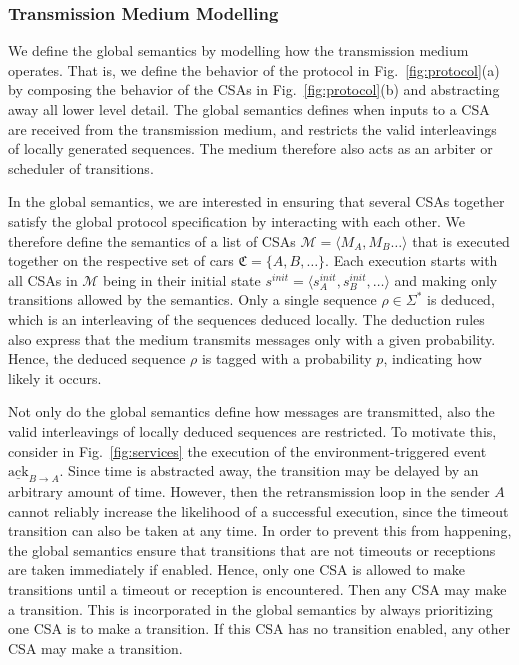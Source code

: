 \documentclass{sig-alternate}
\newcommand{\M}{\mathcal{M}}
\newcommand{\SAP}{\mathfrak{C}}
\newcommand{\locev}[1]{\underline{#1}}
\newcommand{\ack}{\mathrm{ack}}
\newcommand{\eenv}[3]{\locev{#1}_{{#2} \rightarrow {#3}}}
\newcommand{\fig}[1]{Fig.\ \ref{fig:#1}}
\begin{document}
\subsubsection{Transmission Medium Modelling}


We define the global semantics by modelling how the transmission medium operates. That is, we define the behavior of the protocol in \fig{protocol}(a) by composing the behavior of the CSAs in \fig{protocol}(b) and abstracting away all lower level detail. The global semantics defines when inputs to a CSA are received from the transmission medium, and restricts the valid interleavings of locally generated sequences. The medium therefore also acts as an arbiter or scheduler of transitions.

In the global semantics, we are interested in ensuring that several CSAs together satisfy the global protocol specification by interacting with each other. We therefore define the semantics of a list of CSAs $\M = \langle M_A,  M_B \ldots \rangle$ that is executed together on the respective set of cars $\SAP = \{A, B, \ldots \}$. Each execution starts with all CSAs in $\M$ being in their initial state $s^{init} = \langle s_A^{init}, s_B^{init}, \ldots \rangle$ and making only transitions allowed by the semantics. Only a single sequence $\rho \in \Sigma^*$ is deduced, which is an interleaving of the sequences deduced locally. The deduction rules also express that the medium transmits messages only with a given probability. Hence, the deduced sequence $\rho$ is tagged with a probability $p$, indicating how likely it occurs.

Not only do the global semantics define how messages are transmitted, also the valid interleavings of locally deduced sequences are restricted. To motivate this, consider in \fig{services} the execution of the environment-triggered event $\eenv{\ack}{B}{A}$. Since time is abstracted away, the transition may be delayed by an arbitrary amount of time. However, then the retransmission loop in the sender $A$ cannot reliably increase the likelihood of a successful execution, since the timeout transition can also be taken at any time. In order to prevent this from happening, the global semantics ensure that transitions that are not timeouts or receptions are taken immediately if enabled. Hence, only one CSA is allowed to make transitions until a timeout or reception is encountered. Then any CSA may make a transition. This is incorporated in the global semantics by always prioritizing one CSA is to make a transition. If this CSA has no transition enabled, any other CSA may make a transition.
\end{document}
